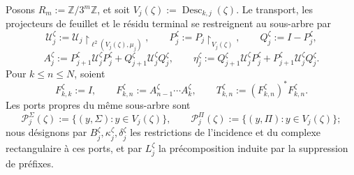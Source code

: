 Posons \(R_m:=\mathbb Z/3^m\mathbb Z\), et soit
\(V_j(\zeta):=\operatorname{Desc}_{k,j}(\zeta)\). Le transport, les
projecteurs de feuillet et le résidu terminal se restreignent au sous-arbre par
\[
 \mathcal U_j^\zeta:=
 \mathcal U_j\!\upharpoonright_{\ell^2(V_j(\zeta),\mu_j)},
 \qquad P_j^\zeta:=P_j\!\upharpoonright_{V_j(\zeta)},
 \qquad Q_j^\zeta:=I-P_j^\zeta,
\]
\[
 A_j^\zeta:=P_{j+1}^\zeta\mathcal U_j^\zeta P_j^\zeta
             +Q_{j+1}^\zeta\mathcal U_j^\zeta Q_j^\zeta,
 \qquad
 \eta_j^\zeta:=Q_{j+1}^\zeta\mathcal U_j^\zeta P_j^\zeta
             +P_{j+1}^\zeta\mathcal U_j^\zeta Q_j^\zeta.
\]
Pour \(k\leq n\leq N\), soient
\[
 F_{k,k}^\zeta:=I,
 \qquad
 F_{k,n}^\zeta:=A_{n-1}^\zeta\cdots A_k^\zeta,
 \qquad
 T_{k,n}^\zeta:=(F_{k,n}^\zeta)^*F_{k,n}^\zeta.
\]
Les ports propres du même sous-arbre sont
\[
 \mathscr P_j^\Sigma(\zeta):=
 \{(y,\Sigma):y\in V_j(\zeta)\},
 \qquad
 \mathscr P_j^\Pi(\zeta):=
 \{(y,\Pi):y\in V_j(\zeta)\};
\]
nous désignons par \(B_j^\zeta,\kappa_j^\zeta,\delta_j^\zeta\) les restrictions de l'incidence et du complexe rectangulaire à ces ports, et par \(L_j^\zeta\) la précomposition induite par la suppression de préfixes.

